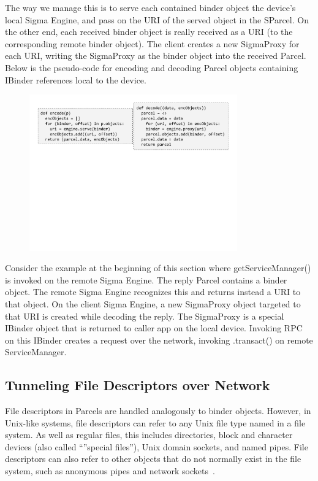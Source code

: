 \documentclass[prodmode]{acmlarge}
\begin{document}
The way we manage this is to serve each contained binder object the device's local Sigma Engine, and pass on the URI of the served object in the SParcel. On the other end, each received binder object is really received as a URI (to the corresponding remote binder object). The client creates a new SigmaProxy for each URI, writing the SigmaProxy as the binder object into the received Parcel. Below is the pseudo-code for encoding and decoding Parcel objects containing IBinder references local to the device.
\begin{figure}[h]
\centering
\includegraphics[width=0.8\textwidth]{drawings/encodeObjects.pdf}
\end{figure}

Consider the example at the beginning of this section where getServiceManager() is invoked on the remote Sigma Engine. The reply Parcel contains a binder object. The remote Sigma Engine recognizes this and returns instead a URI to that object. On the client Sigma Engine, a new SigmaProxy object targeted to that URI is created while decoding the reply. The SigmaProxy is a special IBinder object that is returned to caller app on the local device. Invoking RPC on this IBinder creates a request over the network, invoking .transact() on remote ServiceManager.

\subsection{Tunneling File Descriptors over Network}
File descriptors in Parcels are handled analogously to binder objects. However, in Unix-like systems, file descriptors can refer to any Unix file type named in a file system. As well as regular files, this includes directories, block and character devices (also called ``''special files''), Unix domain sockets, and named pipes. File descriptors can also refer to other objects that do not normally exist in the file system, such as anonymous pipes and network sockets~\cite{UnixDomainSocket}.
\end{document}

